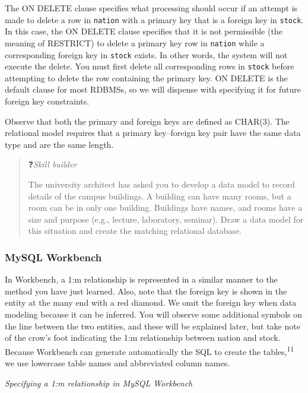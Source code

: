 \documentclass[
]{article}
\begin{document}
The ON DELETE clause specifies what processing should occur if an
attempt is made to delete a row in \texttt{nation} with a primary key that is a
foreign key in \texttt{stock}. In this case, the ON DELETE clause specifies
that it is not permissible (the meaning of RESTRICT) to delete a primary
key row in \texttt{nation} while a corresponding foreign key in \texttt{stock} exists.
In other words, the system will not execute the delete. You must first
delete all corresponding rows in \texttt{stock} before attempting to delete the
row containing the primary key. ON DELETE is the default clause for most
RDBMSs, so we will dispense with specifying it for future foreign key
constraints.

Observe that both the primary and foreign keys are defined as CHAR(3).
The relational model requires that a primary key--foreign key pair have
the same data type and are the same length.

\begin{quote}
❓\emph{Skill builder}

The university architect has asked you to develop a data model to
record details of the campus buildings. A building can have many
rooms, but a room can be in only one building. Buildings have names,
and rooms have a size and purpose (e.g., lecture, laboratory,
seminar). Draw a data model for this situation and create the matching
relational database.
\end{quote}

\hypertarget{mysql-workbench}{%
\subsubsection*{MySQL Workbench}\label{mysql-workbench}}

In Workbench, a 1:m relationship is represented in a similar manner to
the method you have just learned. Also, note that the foreign key is
shown in the entity at the many end with a red diamond. We omit the
foreign key when data modeling because it can be inferred. You will
observe some additional symbols on the line between the two entities,
and these will be explained later, but take note of the crow's foot
indicating the 1:m relationship between nation and stock. Because
Workbench can generate automatically the SQL to create the tables,\textsuperscript{11}
we use lowercase table names and abbreviated column names.

\emph{Specifying a 1:m relationship in MySQL Workbench}
\end{document}
